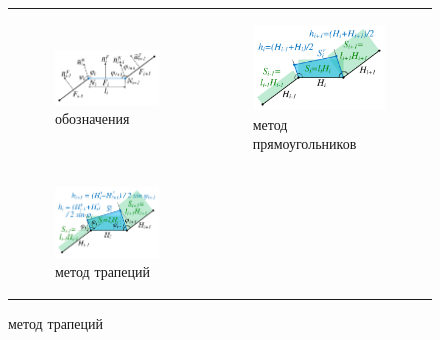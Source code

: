 \documentclass[a4paper,14pt]{extarticle}                     %
\theoremstyle{plain}                                         %
\begin{document}
\begin{figure}[ht]
\centering
\begin{tabular}{ll}
\begin{subfigure}{0.45\textwidth}\centering\includegraphics[width=0.75\columnwidth]{fig/2dr_grid_normals_big.pdf}\caption{обозначения}\end{subfigure} &
\begin{subfigure}{0.45\textwidth}\centering\includegraphics[width=0.75\columnwidth]{fig/2dr_remesh_rectangles_big.pdf}\caption{метод прямоугольников}\end{subfigure} \\
\begin{subfigure}{0.45\textwidth}\centering\includegraphics[width=0.75\columnwidth]{fig/2dr_remesh_trapeziums_big.pdf}\caption{метод трапеций}\end{subfigure} &

\end{tabular}
\end{figure}
\end{document}
